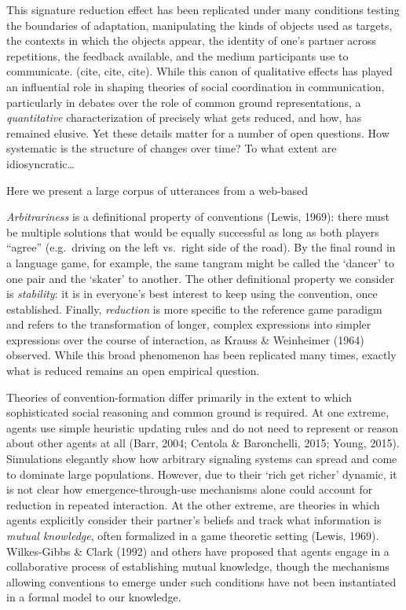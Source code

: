 \documentclass[alpha-refs]{wiley-article}
\begin{document}
This signature reduction effect has been replicated under many conditions testing the boundaries of adaptation, manipulating the kinds of objects used as targets, the contexts in which the objects appear, the identity of one's partner across repetitions, the feedback available, and the medium participants use to communicate. (cite, cite, cite). 
While this canon of qualitative effects has played an influential role in shaping theories of social coordination in communication, particularly in debates over the role of common ground representations, a \emph{quantitative} characterization of precisely what gets reduced, and how, has remained elusive. 
Yet these details matter for a number of open questions. 
How systematic is the structure of changes over time?
To what extent are idiosyncratic\dots
{}

Here we present a large corpus of utterances from a web-based 


\emph{Arbitrariness} is a definitional property of conventions (Lewis,
1969): there must be multiple solutions that would be equally successful
as long as both players ``agree'' (e.g.~driving on the left vs.~right
side of the road). By the final round in a language game, for example,
the same tangram might be called the `dancer' to one pair and the
`skater' to another. The other definitional property we consider is
\emph{stability}: it is in everyone's best interest to keep using the
convention, once established. Finally, \emph{reduction} is more specific
to the reference game paradigm and refers to the transformation of
longer, complex expressions into simpler expressions over the course of
interaction, as Krauss \& Weinheimer (1964) observed. While this broad
phenomenon has been replicated many times, exactly what is reduced
remains an open empirical question.

Theories of convention-formation differ primarily in the extent to which
sophisticated social reasoning and common ground is required. At one
extreme, agents use simple heuristic updating rules and do not need to
represent or reason about other agents at all (Barr, 2004; Centola \&
Baronchelli, 2015; Young, 2015). Simulations elegantly show how
arbitrary signaling systems can spread and come to dominate large
populations. However, due to their `rich get richer' dynamic, it is not
clear how emergence-through-use mechanisms alone could account for
reduction in repeated interaction. At the other extreme, are theories in
which agents explicitly consider their partner's beliefs and track what
information is \emph{mutual knowledge}, often formalized in a game
theoretic setting (Lewis, 1969). Wilkes-Gibbs \& Clark (1992) and others
have proposed that agents engage in a collaborative process of
establishing mutual knowledge, though the mechanisms allowing
conventions to emerge under such conditions have not been instantiated
in a formal model to our knowledge.
\end{document}
